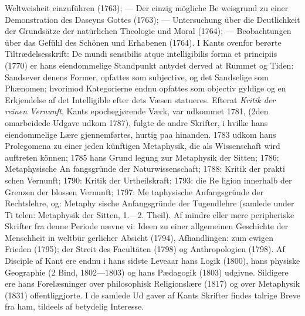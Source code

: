 \documentclass[12pt,a4paper]{book}
\begin{document}
Weltweisheit einzuführen (1763); --- Der einzig mögliche Be\-%
weisgrund zu einer Demonstration des Daseyns Gottes (1763);
--- Untersuchung über die Deutlichkeit der Grundsätze der
natürlichen Theologie und Moral (1764); --- Beobachtungen
über das Gefühl des Schönen und Erhabenen (1764). I Kants
ovenfor berørte Tiltrædelsesskrift: De mundi sensibilis atque
intelligibilis forma et principiis (1770) er hans eiendommelige
Standpunkt antydet derved at Rummet og Tiden: Sandsever\-%
denens Former, opfattes som subjective, og det Sandselige som
Phænomen; hvorimod Kategorierne endnu opfattes som objectiv
gyldige og en Erkjendelse af det Intelligible efter dets Væsen
statueres. Efterat \emph{Kritik der reinen Vernunft}, Kants
epochegjørende Værk, var udkommet 1781, (2den omarbeidede
Udgave udkom 1787), fulgte de andre Skrifter, i hvilke hans
eiendommelige Lære gjennemførtes, hurtig paa hinanden. 1783
udkom hans Prolegomena zu einer jeden künftigen Metaphysik,
die als Wissenschaft wird auftreten können; 1785 hans Grund\-%
legung zur Metaphysik der Sitten; 1786: Metaphysische An\-%
fangsgründe der Naturwissenschaft; 1788: Kritik der prakti\-%
schen Vernunft; 1790: Kritik der Urtheilskraft; 1793: die Re\-%
ligion innerhalb der Grenzen der blossen Vernunft; 1797: Me\-%
taphysische Anfangsgründe der Rechtslehre, og: Metaphy\-%
sische Anfangsgründe der Tugendlehre (samlede under Ti\-%
telen: Metaphysik der Sitten, 1.---2. Theil). Af mindre eller
mere peripheriske Skrifter fra denne Periode nævne vi: Ideen
zu einer allgemeinen Geschichte der Menschheit in weltbür\-%
gerlicher Absicht (1794), Afhandlingen: zum ewigen Frieden
(1795); der Streit des Facultäten (1798) og Anthropologien
(1798). Af Disciple af Kant ere endnu i hans sidste
Leveaar hans Logik (1800), hans physiske Geographie (2 Bind,
1802---1803) og hans Pædagogik (1803) udgivne. Sildigere
ere hans Forelæsninger over philosophisk Religionslære (1817)
og over Metaphysik (1831) offentliggjorte. I de samlede Ud\-%
gaver af Kants Skrifter findes talrige Breve fra ham, tildeels
af betydelig Interesse.
\end{document}
